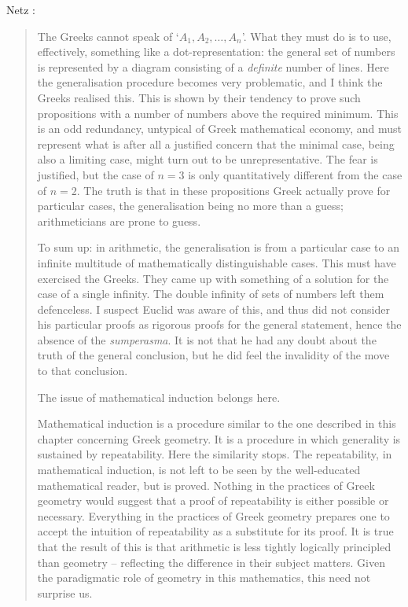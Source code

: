 \documentclass{article}
\begin{document}
Netz \cite[pp.~268--269]{netz}:

\begin{quote}
The Greeks cannot speak of `$A_1,A_2,\ldots,A_n$'.
What they must do is to use, effectively, something like a dot-representation:
the general set of numbers is represented by a diagram consisting 
of a {\em definite} number of lines. Here the generalisation procedure
becomes very problematic, and I think the Greeks realised this. This is
shown by their tendency to prove such propositions with a number of
numbers above the required minimum. This is an odd redundancy,
untypical of Greek mathematical economy, and must represent what is
after all a justified concern that the minimal case, being also a limiting
case, might turn out to be unrepresentative. The fear is justified, but
the case of $n=3$ is only quantitatively different from the case of $n=2$.
The truth is that in these propositions Greek actually prove for particular
cases, the generalisation being no more than a guess; arithmeticians
are prone to guess.

To sum up: in arithmetic, the generalisation is from a particular
case to an infinite multitude of mathematically distinguishable cases.
This must have exercised the Greeks. They came up with something
of a solution for the case of a single infinity. The double infinity of sets
of numbers left them defenceless. I suspect Euclid was aware of this,
and thus did not consider his particular proofs as rigorous proofs for
the general statement, hence the absence of the {\em sumperasma}. It is not
that he had any doubt about the truth of the general conclusion, but
he did feel the invalidity of the move to that conclusion.

The issue of mathematical induction belongs here.

Mathematical induction is a procedure similar to the one described
in this chapter concerning Greek geometry. It is a procedure in which
generality is sustained by repeatability. Here the similarity stops. The
repeatability, in mathematical induction, is not left to be seen by the
well-educated mathematical reader, but is proved. Nothing in the
practices of Greek geometry would suggest that a proof of repeatability
is either possible or necessary. Everything in the practices of Greek
geometry prepares one to accept the intuition of repeatability as a substitute
for its proof. It is true that the result of this is that arithmetic is
less tightly logically principled than geometry -- reflecting the difference
in their subject matters. Given the paradigmatic role of geometry in
this mathematics, this need not surprise us.
\end{quote}
\end{document}
